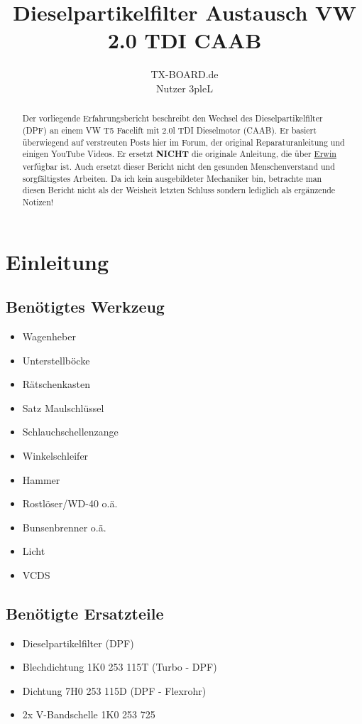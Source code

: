 \documentclass[twoside,a4paper]{refart}
\title{Dieselpartikelfilter Austausch VW 2.0 TDI CAAB}
\author{TX-BOARD.de \\Nutzer 3pleL \\}
\date{}
\begin{document}
\maketitle

\begin{abstract}
	Der vorliegende Erfahrungsbericht beschreibt den Wechsel des Dieselpartikelfilter (DPF) an einem VW T5 Facelift mit 2.0l TDI Dieselmotor (CAAB). Er basiert überwiegend auf verstreuten Posts hier im Forum, der original Reparaturanleitung und einigen YouTube Videos. Er ersetzt \textbf{NICHT} die originale Anleitung, die über \href{https://erwin.volkswagen.de/erwin/showHome.do}{Erwin} verfügbar ist. Auch ersetzt dieser Bericht nicht den gesunden Menschenverstand und sorgfältigstes Arbeiten. 
	Da ich kein ausgebildeter Mechaniker bin, betrachte man diesen Bericht nicht als der Weisheit letzten Schluss sondern lediglich als ergänzende Notizen!
\end{abstract}

\tableofcontents

\newpage



\section{Einleitung}

\subsection{Benötigtes Werkzeug}
\begin{itemize}
	\item Wagenheber
	\item Unterstellböcke
	\item Rätschenkasten 
	\item Satz Maulschlüssel
	\item Schlauchschellenzange
	\item Winkelschleifer 
	\item Hammer
	\item Rostlöser/WD-40 o.ä.
	\item Bunsenbrenner o.ä.
	\item Licht
	\item VCDS
\end{itemize}

\subsection{Benötigte Ersatzteile}
\begin{itemize}
	\item Dieselpartikelfilter (DPF)
	\item Blechdichtung 1K0 253 115T (Turbo - DPF)
	\item Dichtung 7H0 253 115D (DPF - Flexrohr)
	\item 2x V-Bandschelle 1K0 253 725
\end{itemize}
\end{document}
